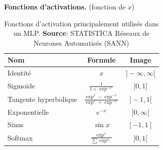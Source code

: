 {\begin{table}
 \centering
 \textbf{Fonctions d'activations.} (fonction de $x$)\\
 \begin{tabular}{|l|c|c|}
  Nom & Formule & Image\\
  \hline
  Identité & $x$ & $]-\infty,\infty[$\\
  \hline
  Sigmoïde & $\frac{1}{1+\exp^{-x}}$ & $]0,1]$\\
  \hline
  Tangente hyperbolique & $\frac{\exp^{x}-\exp^{-x}}{\exp^{x}+\exp^{-x}}$ & $]-1,1[$\\
  \hline
  Exponentielle & $e^{-x}$ & $]0,\infty[$\\
  \hline
  Sinus & $\sin{x}$ & $[-1,1]$\\
  \hline
  Softmax & $\frac{\exp^{x}}{\sum{\exp^{x_i}}}$ & $]0,1[$\\
  \hline
 \end{tabular}
 \caption{Fonctions d'activation principalement utilisés dans un MLP. \textbf{Source}: STATISTICA Réseaux de Neurones Automatisés (SANN)\cite{statistica}}
 \label{mlpfonc}
\end{table}
}
